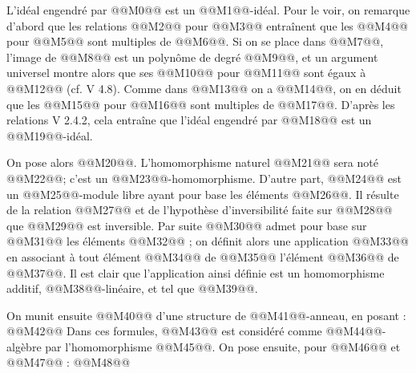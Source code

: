 
L'idéal engendré par @@M0@@ est un @@M1@@-idéal. Pour le voir, on remarque d'abord que les relations @@M2@@ pour @@M3@@ entraînent que les @@M4@@ pour @@M5@@ sont multiples de @@M6@@. Si on se place dans @@M7@@, l'image de @@M8@@ est un polynôme de degré @@M9@@, et un argument universel montre alors que ses @@M10@@ pour @@M11@@ sont égaux à @@M12@@ (cf. V 4.8). Comme dans @@M13@@ on a @@M14@@, on en déduit que les @@M15@@ pour @@M16@@ sont multiples de @@M17@@. D'après les relations V 2.4.2, cela entraîne que l'idéal engendré par @@M18@@ est un @@M19@@-idéal.

On pose alors @@M20@@. L'homomorphisme naturel @@M21@@ sera noté @@M22@@; c'est un @@M23@@-homomorphisme. D'autre part, @@M24@@ est un @@M25@@-module libre ayant pour base les éléments @@M26@@. Il résulte de la relation @@M27@@ et de l'hypothèse d'inversibilité faite sur @@M28@@ que @@M29@@ est inversible. Par suite @@M30@@ admet pour base sur @@M31@@ les éléments @@M32@@ ; on définit alors une application @@M33@@ en associant à tout élément @@M34@@ de @@M35@@ l'élément @@M36@@ de @@M37@@. Il est clair que l'application ainsi définie est un homomorphisme additif, @@M38@@-linéaire, et tel que @@M39@@.

On munit ensuite @@M40@@ d'une structure de @@M41@@-anneau, en posant :
@@M42@@
Dans ces formules, @@M43@@ est considéré comme @@M44@@-algèbre par l'homomorphisme @@M45@@.
On pose ensuite, pour @@M46@@ et @@M47@@ :
@@M48@@

